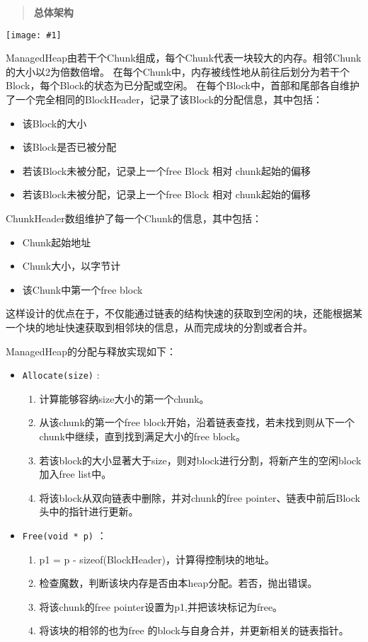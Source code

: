 \documentclass[12pt, a4paper]{article}
\def\c#1{\texttt{#1}}
\def\b#1{\textbf{#1}}
\def\p{\par}
\def\g#1{\begin{center}\texttt{[image: \#1]}\end{center}}
\def\q#1{\begin{quote}\b{#1}\end{quote}}
\begin{document}
\q{总体架构}
\g{managedHeap.pdf}
\p ManagedHeap由若干个Chunk组成，每个Chunk代表一块较大的内存。相邻Chunk的大小以2为倍数倍增。
在每个Chunk中，内存被线性地从前往后划分为若干个Block，每个Block的状态为已分配或空闲。
在每个Block中，首部和尾部各自维护了一个完全相同的BlockHeader，记录了该Block的分配信息，其中包括：
\begin{itemize}
  \item 该Block的大小
  \item 该Block是否已被分配
  \item 若该Block未被分配，记录上一个free Block 相对 chunk起始的偏移
  \item 若该Block未被分配，记录上一个free Block 相对 chunk起始的偏移
\end{itemize}
\p ChunkHeader数组维护了每一个Chunk的信息，其中包括：
\begin{itemize}
  \item Chunk起始地址
  \item Chunk大小，以字节计
  \item 该Chunk中第一个free block
\end{itemize}
\p 这样设计的优点在于，不仅能通过链表的结构快速的获取到空闲的块，还能根据某一个块的地址快速获取到相邻块的信息，从而完成块的分割或者合并。
\p ManagedHeap的分配与释放实现如下：
\begin{itemize}
  \item \c{Allocate(size)} : \begin{enumerate}
    \item 计算能够容纳size大小的第一个chunk。
    \item 从该chunk的第一个free block开始，沿着链表查找，若未找到则从下一个chunk中继续，直到找到满足大小的free block。
    \item 若该block的大小显著大于size，则对block进行分割，将新产生的空闲block加入free list中。
    \item 将该block从双向链表中删除，并对chunk的free pointer、链表中前后Block头中的指针进行更新。
  \end{enumerate}
  \item \c{Free(void * p)} ：\begin{enumerate}
    \item p1 = p - sizeof(BlockHeader)，计算得控制块的地址。
    \item 检查魔数，判断该块内存是否由本heap分配。若否，抛出错误。
    \item 将该chunk的free pointer设置为p1,并把该块标记为free。
    \item 将该块的相邻的也为free 的block与自身合并，并更新相关的链表指针。
  \end{enumerate}
\end{itemize}
\end{document}
